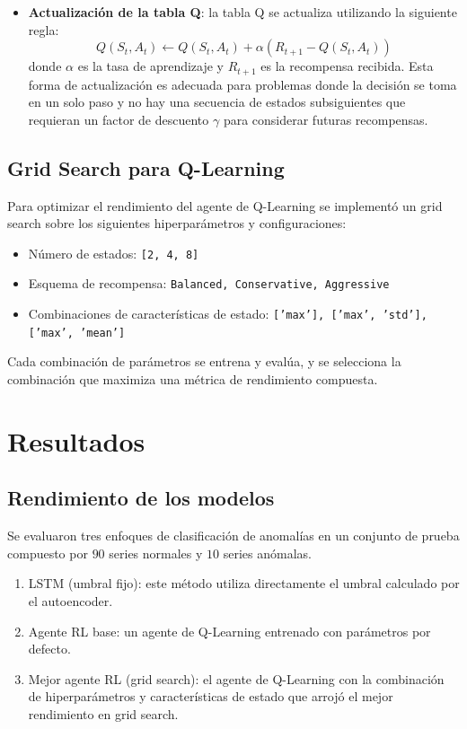 \documentclass[12pt]{article}
\begin{document}
\begin{itemize}
    \item \textbf{Actualización de la tabla Q}: la tabla Q se actualiza utilizando la siguiente regla:
    $$Q(S_t, A_t) \leftarrow Q(S_t, A_t) + \alpha (R_{t+1} - Q(S_t, A_t))$$
    donde $\alpha$ es la tasa de aprendizaje y $R_{t+1}$ es la recompensa recibida.
    Esta forma de actualización es adecuada para problemas donde la decisión se toma en un solo paso y no hay una secuencia de estados subsiguientes que requieran un factor de descuento $\gamma$ para considerar futuras recompensas.
\end{itemize}

\subsection{Grid Search para Q-Learning}
Para optimizar el rendimiento del agente de Q-Learning se implementó un grid search sobre los siguientes hiperparámetros y configuraciones:
\begin{itemize}
    \item Número de estados: \texttt{[2, 4, 8]}
    \item Esquema de recompensa: \texttt{Balanced, Conservative, Aggressive}
    \item Combinaciones de características de estado: \texttt{['max'], ['max', 'std'], ['max', 'mean']}
\end{itemize}
Cada combinación de parámetros se entrena y evalúa, y se selecciona la combinación que maximiza una métrica de rendimiento compuesta.


\bigskip
\section{Resultados}
\label{sec:resultados}

\subsection{Rendimiento de los modelos}
Se evaluaron tres enfoques de clasificación de anomalías en un conjunto de prueba compuesto por $90$ series normales y $10$ series anómalas.

\begin{enumerate}
    \item LSTM (umbral fijo): este método utiliza directamente el umbral calculado por el autoencoder.
    \item Agente RL base: un agente de Q-Learning entrenado con parámetros por defecto.
    \item Mejor agente RL (grid search): el agente de Q-Learning con la combinación de hiperparámetros y características de estado que arrojó el mejor rendimiento en grid search.
\end{enumerate}
\end{document}
